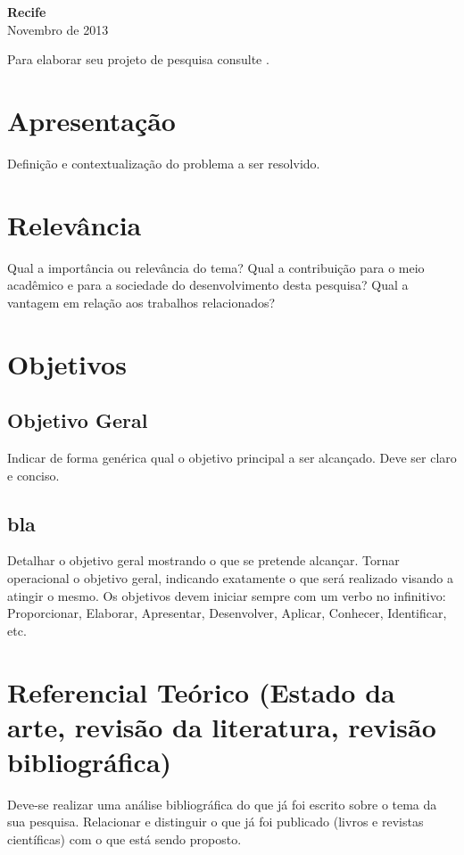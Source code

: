 \documentclass[a4paper,11pt]{article}
\begin{document}
\vspace{3.0cm}
\begin{center}
{\large {\bf Recife}\\[6mm]
Novembro de 2013}
\end{center}
\newpage

\pagestyle {plain}
\setcounter{page}{0} 

Para elaborar seu projeto de pesquisa consulte \cite{Silva05}. 


\section{Apresentação}
Definição e contextualização do problema a ser resolvido.
\section{Relevância}
Qual a importância ou relevância do tema?  Qual a contribuição para o meio acadêmico e para a sociedade do desenvolvimento desta pesquisa? Qual a vantagem em relação aos trabalhos relacionados?
\section{Objetivos}
\subsection{Objetivo Geral}
Indicar de forma genérica qual o objetivo principal a ser alcançado. Deve ser claro e conciso.
\subsection{bla}
Detalhar o objetivo geral mostrando o que se pretende alcançar. Tornar operacional o objetivo geral, indicando exatamente o que será realizado visando a atingir o mesmo.
Os objetivos devem iniciar sempre com um verbo no infinitivo: Proporcionar, Elaborar, Apresentar, Desenvolver, Aplicar, Conhecer, Identificar, etc.

\section{Referencial Teórico  (Estado da arte, revisão da literatura, revisão bibliográfica)} 
Deve-se realizar uma análise bibliográfica do que já foi escrito sobre o tema da sua pesquisa. Relacionar e distinguir o que já foi publicado (livros e revistas científicas) com o que está sendo proposto.
\end{document}

